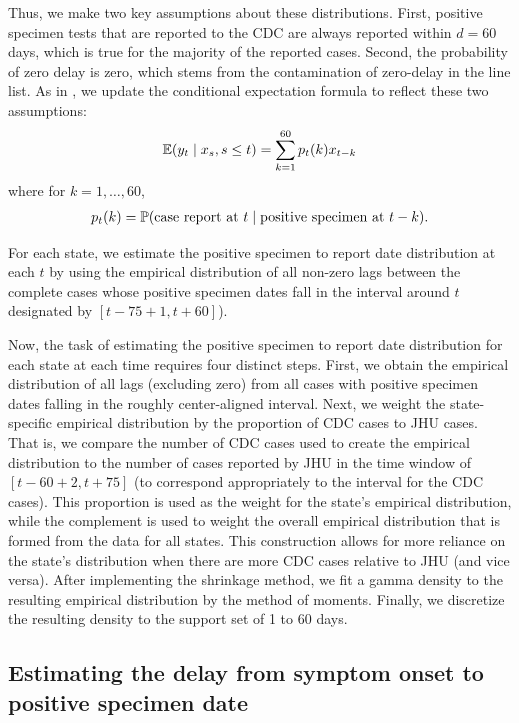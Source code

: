 \documentclass{article}
\begin{document}
Thus, we make two key assumptions about these distributions. First,
positive specimen tests that are reported to the CDC are always reported within $d = 60$
days, which is true for the majority of the reported cases. Second, the
probability of zero delay is zero, which stems from the contamination of
zero-delay in the line list. As in \citet{jahja2022real}, we update the
conditional expectation formula to reflect these two assumptions: 
\begin{align*}
\E(y_t \mid x_s, s \leq t) = \sum_{k=1}^{60} p_t(k) x_{t-k}
\end{align*}
where for $k = 1, \dots, 60$,
\begin{align*}
p_t(k) = \P(\text{case report at }t \mid \text{positive specimen at }t-k).
\end{align*}

For each state, we estimate the positive specimen to report date distribution at each $t$ by using the empirical distribution of
all non-zero lags between the complete cases whose positive specimen dates fall in the
 interval around $t$ designated by $[ t - 75 + 1, t + 60]$). 

Now, the task of estimating the positive specimen to report date distribution for each state at each time
requires four distinct steps. First, we obtain the empirical
distribution of all lags (excluding zero) from all cases with positive specimen dates
falling in the roughly center-aligned interval. Next, we weight the state-specific
empirical distribution by the proportion of CDC cases to JHU cases. That is, we
compare the number of CDC cases used to create the empirical distribution to the
number of cases reported by JHU in the time window of $\left[t - 60 + 2, t +
75\right]$ (to correspond appropriately to the interval for
the CDC cases). This proportion is used as the weight for the state's empirical
distribution, while the complement is used to weight the overall empirical
distribution that is formed from the data for all states. This construction
allows for more reliance on the state's distribution when there are more CDC
cases relative to JHU (and vice versa). After implementing the shrinkage method,
we fit a gamma density to the resulting empirical distribution by the method of
moments. Finally, we discretize the resulting density to the support set of 1
to 60 days.
 
\subsection{Estimating the delay from symptom onset to positive specimen date}  \label{delaystop} %
\end{document}
